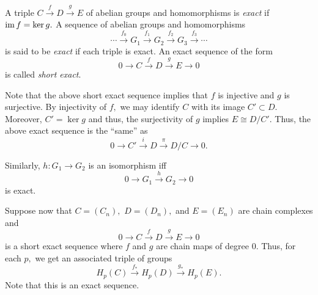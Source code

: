 \documentclass[12pt]{article}
\begin{document}
\begin{defn}[Exact]
	A triple $C \overset{f}{\longrightarrow} D \overset{g}{\longrightarrow} E$ of abelian groups and homomorphisms is \emph{exact} if $\operatorname{im} f = \ker g.$ A sequence of abelian groups and homomorphisms
	\begin{equation*} 
		\cdots \overset{f_0}{\longrightarrow} G_1 \overset{f_1}{\longrightarrow} G_2 \overset{f_2}{\longrightarrow} G_3 \overset{f_3}{\longrightarrow} \cdots
	\end{equation*}
	is said to be \emph{exact} if each triple is exact. An exact sequence of the form
	\begin{equation*} 
		0 \overset{}{\longrightarrow} C \overset{f}{\longrightarrow} D \overset{g}{\longrightarrow} E \overset{}{\longrightarrow} 0
	\end{equation*}
	is called \emph{short exact}.
\end{defn}

Note that the above short exact sequence implies that $f$ is injective and $g$ is surjective. By injectivity of $f,$ we may identify $C$ with its image $C' \subset D.$ Moreover, $C' = \ker g$ and thus, the surjectivity of $g$ implies $E \cong D/C'.$ Thus, the above exact sequence is the ``same'' as
\begin{equation*} 
	0 \overset{}{\longrightarrow} C' \overset{i}{\longrightarrow} D \overset{\pi}{\longrightarrow} D/C \overset{}{\longrightarrow} 0.
\end{equation*} 

Similarly, $h:G_1 \to G_2$ is an isomorphism iff 
\begin{equation*} 
	0 \overset{}{\longrightarrow} G_1 \overset{h}{\longrightarrow} G_2 \overset{}{\longrightarrow} 0
\end{equation*}
is exact.

Suppose now that $C = (C_n),$ $D = (D_n),$ and $E = (E_n)$ are chain complexes and
\begin{equation*} 
	0 \overset{}{\longrightarrow} C \overset{f}{\longrightarrow} D \overset{g}{\longrightarrow} E \overset{}{\longrightarrow} 0
\end{equation*}
is a short exact sequence where $f$ and $g$ are chain maps of degree $0.$ Thus, for each $p,$ we get an associated triple of groups
\begin{equation*} 
	H_p(C) \overset{f_*}{\longrightarrow} H_p(D) \overset{g_*}{\longrightarrow} H_p(E).
\end{equation*}
Note that this is an exact sequence. 
\end{document}

